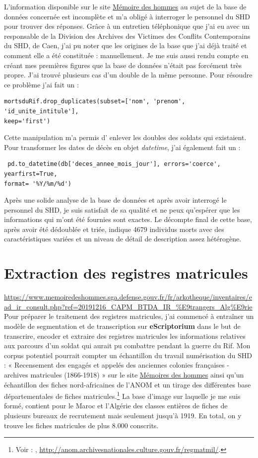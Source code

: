 L’information disponible sur le site \underline{Mémoire des hommes} au sujet de la base de données concernée est incomplète et m’a obligé à interroger le personnel du SHD pour trouver des réponses. Grâce à un entretien téléphonique que j’ai eu avec un responsable de la Division des Archives des Victimes des Conflits Contemporains du SHD, de Caen, j’ai pu noter que les origines de la base que j’ai déjà traité et comment elle a été constituée : manuellement. Je me suis aussi rendu compte en créant mes premières figures que la base de données n'était pas forcément très propre. J'ai trouvé plusieurs cas d'un double de la même personne. Pour résoudre ce problème j'ai fait un : \begin{verbatim}mortsduRif.drop_duplicates(subset=['nom', 'prenom', 'id_unite_intitule'], 
keep='first')\end{verbatim} Cette manipulation m’a permis d' enlever les doubles des soldats qui existaient. Pour transformer les dates de décès en objet \emph{datetime}, j’ai également fait un : \begin{verbatim} pd.to_datetime(db['deces_annee_mois_jour'], errors='coerce', yearfirst=True, 
format= '%Y/%m/%d')
\end{verbatim}Après une solide analyse de la base de données et après avoir interrogé le personnel du SHD, je suis satisfait de sa qualité et ne peux qu'espérer que les informations qui m'ont été fournies sont exactes. Le décompte final de cette base, après avoir été dédoublée et triée, indique 4679 individus morts avec des caractéristiques variées et un niveau de détail de description assez hétérogène.  

\section{Extraction des registres matricules}
\urldef\maturl\url{https://www.memoiredeshommes.sga.defense.gouv.fr/fr/arkotheque/inventaires/ead_ir_consult.php?ref=20191216_CAPM_BTDA_IR_%E9trangers_Alg%E9rie}
Pour préparer le traitement des registres matricules, j’ai commencé à entraîner un modèle de segmentation et de transcription sur \textbf{eScriptorium} dans le but de transcrire, encoder et extraire des registres matricules les informations relatives aux parcours d’un soldat qui aurait pu combattre pendant la guerre du Rif. Mon corpus potentiel pourrait compter un échantillon du travail numérisation du SHD : « Recensement des engagés et appelés des anciennes colonies françaises - archives matricules (1866-1918) » sur le site \underline{Mémoires des hommes} ainsi qu’un échantillon des fiches nord-africaines de l’ANOM et un tirage des différentes base départementales de fiches matricules.\footnote{Voir : \maturl  ,   \url{http://anom.archivesnationales.culture.gouv.fr/regmatmil/}.} La base d’image sur laquelle je me suis formé, contient pour le Maroc et l'Algérie des classes entières de fiches de plusieurs bureaux de recrutement mais seulement jusqu'à 1919. En total, on y trouve les fiches matricules de plus 8.000 conscrits.\\


